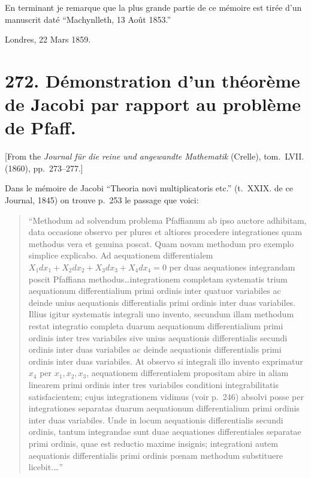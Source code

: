 \documentclass[11pt,a4paper]{article}
\theoremstyle{definition}
\begin{document}
En terminant je remarque que la plus grande partie de ce m\'{e}moire est tir\'{e}e d'un
manuscrit dat\'{e} ``Machynlleth, 13 Ao\^{u}t 1853.''

\begin{flushright}
Londres, 22 Mars 1859.
\end{flushright}

\newpage
\section*{272. D\'{e}monstration d'un th\'{e}or\`{e}me de Jacobi par rapport au probl\`{e}me de Pfaff.}

[From the \textit{Journal f\"{u}r die reine und angewandte Mathematik} (Crelle),
tom.~LVII. (1860), pp.~273--277.]
\vspace{0.5em}

Dans le m\'{e}moire de Jacobi ``Theoria novi multiplicatoris etc.'' (t.~XXIX. de ce
Journal, 1845) on trouve p.~253 le passage que voici:
\begin{quote}
``Methodum ad solvendum problema Pfaffianum ab ipso auctore adhibitam, data occasione
observo per plures et altiores procedere integrationes quam methodus vera et genuina
poscat. Quam novam methodum pro exemplo simplice explicabo. Ad aequationem differentialem
$X_{1}dx_{1}+X_{2}dx_{2}+X_{3}dx_{3}+X_{4}dx_{4}=0$ per duas aequationes integrandam
poscit Pfaffiana methodus\ldots integrationem completam systematis trium aequationum
differentialium primi ordinis inter quatuor variabiles ac deinde unius aequationis
differentialis primi ordinis inter duas variabiles. Illius igitur systematis integrali
uno invento, secundum illam methodum restat integratio completa duarum aequationum
differentialium primi ordinis inter tres variabiles sive unius aequationis differentialis
secundi ordinis inter duas variabiles ac deinde aequationis differentialis primi ordinis
inter duas variabiles. At observo si integrali illo invento exprimatur $x_{4}$ per
$x_{1}, x_{2}, x_{3}$, aequationem differentialem propositam abire in aliam linearem
primi ordinis inter tres variabiles conditioni integrabilitatis satisfacientem; cujus
integrationem vidimus (voir p.~246) absolvi posse per integrationes separatas duarum
aequationum differentialium primi ordinis inter duas variabiles. Unde in locum
aequationis differentialis secundi ordinis, tantum integrandae sunt duae aequationes
differentiales separatae primi ordinis, quae est reductio maxime insignis; integrationi
autem aequationis differentialis primi ordinis p\oe{}nam methodum substituere licebit.\ldots''
\end{quote}
\end{document}
